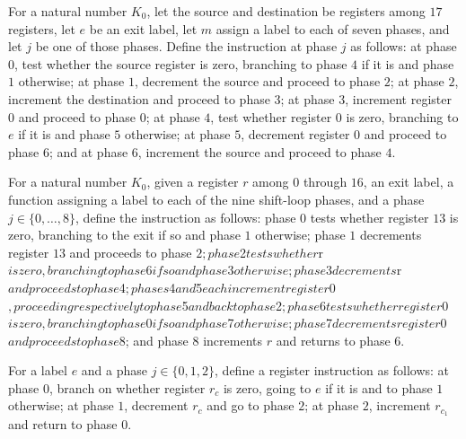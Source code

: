 \begin{definition}
\label{Complexity.LogProg.ExpBFS.cpI}
\leanok
{}
For a natural number $K_0$, let the source and destination be registers among $17$
registers, let $e$ be an exit label, let $m$ assign a label to each of seven phases, and
let $j$ be one of those phases. Define the instruction at phase $j$ as follows: at phase
$0$, test whether the source register is zero, branching to phase $4$ if it is and phase
$1$ otherwise; at phase $1$, decrement the source and proceed to phase $2$; at phase
$2$, increment the destination and proceed to phase $3$; at phase $3$, increment
register $0$ and proceed to phase $0$; at phase $4$, test whether register $0$ is zero,
branching to $e$ if it is and phase $5$ otherwise; at phase $5$, decrement register $0$
and proceed to phase $6$; and at phase $6$, increment the source and proceed to phase
$4$.
\end{definition}

\begin{definition}
\label{Complexity.LogProg.ExpBFS.shI}
\leanok
{}
For a natural number $K_0$, given a register $r$ among $0$ through $16$, an exit label,
a function assigning a label to each of the nine shift-loop phases, and a phase
$j\in\{0,\ldots,8\}$, define the instruction as follows: phase $0$ tests whether
register $13$ is zero, branching to the exit if so and phase $1$ otherwise; phase $1$
decrements register $13$ and proceeds to phase $2; phase $2$ tests whether $r$ is zero,
branching to phase $6$ if so and phase $3$ otherwise; phase $3$ decrements $r$ and
proceeds to phase $4$; phases $4$ and $5$ each increment register $0$, proceeding
respectively to phase $5$ and back to phase $2$; phase $6$ tests whether register $0$ is
zero, branching to phase $0$ if so and phase $7$ otherwise; phase $7$ decrements
register $0$ and proceeds to phase $8; and phase $8$ increments $r$ and returns to phase
$6$.
\end{definition}

\begin{definition}
\label{Complexity.LogProg.ExpBFS.mvI}
\leanok
{}
For a label $e$ and a phase $j\in\{0,1,2\}$, define a register instruction as follows:
at phase $0$, branch on whether register $r_c$ is zero, going to $e$ if it is and to
phase $1$ otherwise; at phase $1$, decrement $r_c$ and go to phase $2$; at phase $2$,
increment $r_{c_1}$ and return to phase $0$.
\end{definition}


